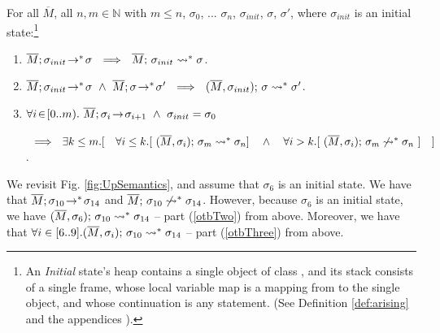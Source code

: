  \begin{lemma}
\label{lemma:orig:to:bounded}
For all $\overline M$, all $n,m\in \mathbb{N}$ with $m\leq n$, $\sigma_0$, ... $\sigma_n$,  $\sigma_{init}$, $\sigma$, $\sigma'$, where
$\sigma_{init}$ is an initial state:\footnote{An \emph{Initial} state's heap contains a single object of class , and
its  stack   consists of a single frame, whose local variable map is a mapping from  to the single object, and whose continuation is  any statement.
(See Definition %
\ref{def:arising} and the 
{appendices %
\cite{necessityFull}).}} 
\begin{enumerate} 
\item 
\label{otbOne}
$\leadstoOrigStar {\Mtwo} {\sigma_{init}}  {\sigma}\ \ \Longrightarrow\ \  \leadstoBoundedStar {\Mtwo}  {\sigma_{init}} {\sigma}$.
\item 
\label{otbTwo}
$\leadstoOrigStar {\Mtwo} {\sigma_{init}}  {\sigma}\ \wedge\ \leadstoOrigStar {\Mtwo} {\sigma}  {\sigma'}\ \ \Longrightarrow\ \  \leadstoBoundedStarThree {\Mtwo} {\sigma} {\sigma_{init}} {\sigma'}$.
\item
\label{otbThree}
 $\forall i\!\in\! [0..m).\ \leadstoOrig  {\Mtwo} {\sigma_{i}}  {\sigma_{i+1}}\ \wedge\ \sigma_{init}=\sigma_0$ \\
\strut \hspace{0.5cm} $\ \ \Longrightarrow \ \  \exists k\leq m.[\ \ \ \forall i\leq k.[\  %
\leadstoBoundedStarThree  {\Mtwo}  {\sigma_m}  {\sigma_{i}} {\sigma_n} ]\ \ \  \wedge \ \ \ 
 \forall i> k. [\  \notLeadstoBoundedStarThree  {\Mtwo}  {\sigma_m}  {\sigma_{i}} {\sigma_n}\ ] \ \ \ ]$.
\end{enumerate} 
\end{lemma}
 



{We revisit  Fig. \ref{fig:UpSemantics}, and assume that $\sigma_6$ is an initial state.
We have that $\leadstoOrigStar {\Mtwo} {\sigma_{10}}  {\sigma_{14}}$ and $ \notLeadstoBoundedStar {\Mtwo}  {\sigma_{10}} {\sigma_{14}}$.
However, because $\sigma_6$ is an initial state, we have $\leadstoBoundedStarThree {\Mtwo}  {\sigma_{10}} {\sigma_{6}}  {\sigma_{14}}$ -- part (\ref{otbTwo}) 
from above. 
Moreover, we have that  $\forall i\in [6..9].\leadstoBoundedStarThree {\Mtwo}  {\sigma_{10}} {\sigma_{i}}  {\sigma_{14}}$ -- part (\ref{otbThree}) 
from above. 
}
